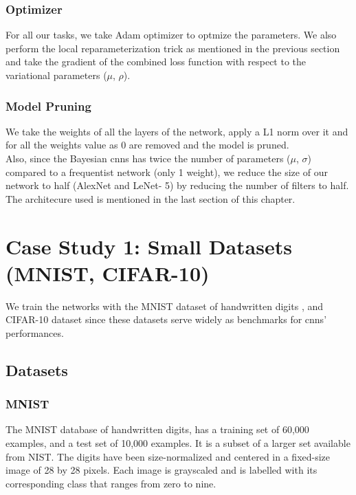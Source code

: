 \subsubsection{Optimizer}

For all our tasks, we take Adam optimizer \cite{KingmaB14} to optmize the parameters. We also perform the local reparameterization trick as mentioned in the previous section and take the gradient of the combined loss function with respect to the variational parameters ($\mu$, $\rho$).

\subsubsection{Model Pruning}

We take the weights of all the layers of the network, apply a L1 norm over it and for all the weights value as 0 are removed and the model is pruned. \\ Also, since the Bayesian \acp{cnn} has twice the number of parameters ($\mu$, $\sigma$) compared to a frequentist network (only 1 weight), we reduce the size of our network to half (AlexNet and LeNet- 5) by reducing the number of filters to half. The architecure used is mentioned in the last section of this chapter.

\section{Case Study 1: Small Datasets (MNIST, CIFAR-10)}

We train the networks with the MNIST dataset of handwritten digits \cite{lecun1998gradient}, and CIFAR-10 dataset \cite{krizhevsky2009learning} since these datasets serve widely as benchmarks for \acp{cnn}' performances. 

\subsection{Datasets}
\newline
\subsubsection{MNIST}
The MNIST database \cite{lecun-mnisthandwrittendigit-2010} of handwritten digits, has a training set of 60,000 examples, and a test set of 10,000 examples. It is a subset of a larger set available from NIST. The digits have been size-normalized and centered in a fixed-size image of 28 by 28 pixels. Each image is grayscaled and is labelled with its corresponding class that ranges from zero to nine.
\newline


